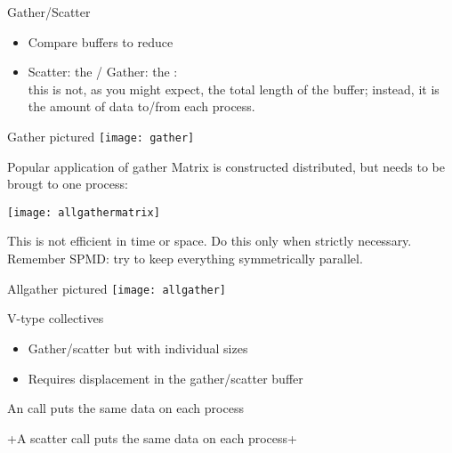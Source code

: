 \begin{numberedframe}{Gather/Scatter}
\begin{itemize}
\item Compare buffers to reduce
\item Scatter: the  / Gather: the :\\
this is not, as you might expect, the total length of the
buffer; instead, it is the amount of data to/from each process.
\end{itemize}
\end{numberedframe}

\begin{numberedframe}{Gather pictured}
  \texttt{[image: gather]}
\end{numberedframe}

\begin{numberedframe}{Popular application of gather}
  Matrix is constructed distributed, but needs to be brougt to one
  process:
  
  \texttt{[image: allgathermatrix]}

  This is not efficient in time or space. Do this
  only when strictly necessary. Remember SPMD: try to keep everything
  symmetrically parallel. 
\end{numberedframe}


\begin{numberedframe}{Allgather pictured}
  \texttt{[image: allgather]}
\end{numberedframe}

\begin{numberedframe}{V-type collectives}
  \begin{itemize}
  \item Gather/scatter but with individual sizes
  \item Requires displacement in the gather/scatter buffer
  \end{itemize}
\end{numberedframe}


\begin{exerciseframe}[scangather]
  
\end{exerciseframe}

\begin{reviewframe}
  An  call puts the same data on each process
  
  \slackpollTF+A scatter call puts the same data on each process+
\end{reviewframe}

